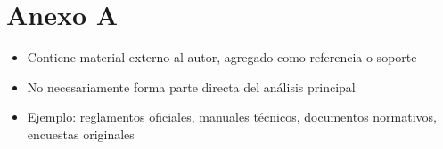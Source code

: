\chapter*{Anexo A}
\begin{itemize}
    \item Contiene material externo al autor, agregado como referencia o soporte

    \item No necesariamente forma parte directa del análisis principal

    \item Ejemplo: reglamentos oficiales, manuales técnicos, documentos normativos, encuestas originales
\end{itemize}

